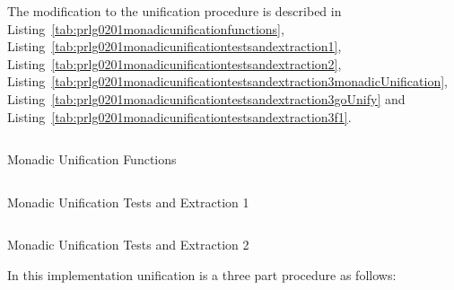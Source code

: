 \documentclass[thesis-solanki.tex]{subfiles}
\begin{document}
The modification to the unification procedure is described in Listing~\ref{tab:prlg0201monadicunificationfunctions},
Listing~\ref{tab:prlg0201monadicunificationtestsandextraction1}, Listing~\ref{tab:prlg0201monadicunificationtestsandextraction2},
Listing~\ref{tab:prlg0201monadicunificationtestsandextraction3monadicUnification},
Listing~\ref{tab:prlg0201monadicunificationtestsandextraction3goUnify} and
Listing~\ref{tab:prlg0201monadicunificationtestsandextraction3f1}.


\begin{code-list}[H]
  \begin{singlespace}
    \inputminted[linenos]{haskell}{haskell-proto2-monadic-unification-functions.hs}
  \end{singlespace}
\caption{ Monadic Unification Functions}
\label{tab:prlg0201monadicunificationfunctions}
\end{code-list}

\begin{code-list}[H]
  \begin{singlespace}
    \inputminted[linenos,lastline=43]{haskell}{haskell-proto2-monadic-unification-tests-and-extraction.hs}
  \end{singlespace}
\caption{ Monadic Unification Tests and Extraction 1}
\label{tab:prlg0201monadicunificationtestsandextraction1}
\end{code-list}

\begin{code-list}[H]
  \begin{singlespace}
    \inputminted[linenos,firstline=45, lastline=71]{haskell}{haskell-proto2-monadic-unification-tests-and-extraction.hs}
  \end{singlespace}
\caption{ Monadic Unification Tests and Extraction 2}
\label{tab:prlg0201monadicunificationtestsandextraction2}
\end{code-list}

In this implementation unification is a three part procedure as follows:
\end{document}
